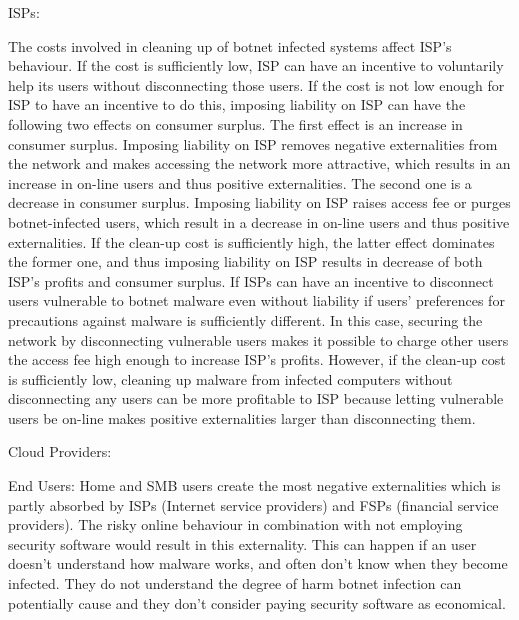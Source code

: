 ISPs:

The costs involved in cleaning up of botnet infected systems affect ISP’s behaviour. If the cost is sufficiently low, ISP can have an incentive to voluntarily help its users without disconnecting those users. If the cost is not low enough for ISP to have an incentive to do this, imposing liability on ISP can have the following two effects on consumer surplus. The first effect is an increase in consumer surplus. Imposing liability on ISP removes negative externalities from the network and makes accessing the network more attractive, which results in an increase in on-line users and thus positive externalities. The second one is a decrease in consumer surplus. Imposing liability on ISP raises access fee or purges botnet-infected users, which result in a decrease in on-line users and thus positive externalities. If the clean-up cost is sufficiently high, the latter effect dominates the former one, and thus imposing liability on ISP results in decrease of both ISP’s profits and consumer surplus. If ISPs can have an incentive to disconnect users vulnerable to botnet malware even without liability if users’ preferences for precautions against malware is sufficiently different. In this case, securing the network by disconnecting vulnerable users makes it possible to charge other users the access fee high enough to increase ISP’s profits. However, if the clean-up cost is sufficiently low, cleaning up malware from infected computers without disconnecting any users can be more profitable to ISP because letting vulnerable users be on-line makes positive externalities larger than disconnecting them.

Cloud Providers:


End Users:
Home and SMB users create the most negative externalities which is partly absorbed by ISPs (Internet service providers) and FSPs (financial service providers). The risky online behaviour in combination with not employing security software would result in this externality. This can happen  if an user doesn’t understand how malware works, and often don’t know when they become infected. They do not understand the degree of harm botnet infection can potentially cause and they don't consider paying security software as economical. 
